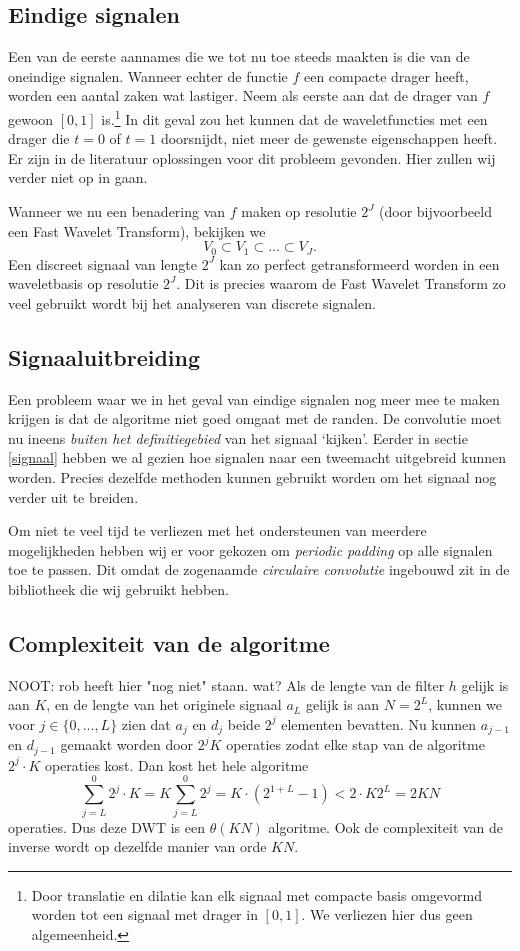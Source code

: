 \subsection{Eindige signalen}
Een van de eerste aannames die we tot nu toe steeds maakten is die van de oneindige signalen. Wanneer echter de functie $f$ een compacte drager heeft, worden een aantal zaken wat lastiger. Neem als eerste aan dat de drager van $f$ gewoon $[0,1]$ is.\footnote{Door translatie en dilatie kan elk signaal met compacte basis omgevormd worden tot een signaal met drager in $[0,1]$. We verliezen hier dus geen algemeenheid.} In dit geval zou het kunnen dat de waveletfuncties met een drager die $t=0$ of $t=1$ doorsnijdt, niet meer de gewenste eigenschappen heeft. Er zijn in de literatuur oplossingen voor dit probleem gevonden. Hier zullen wij verder niet op in gaan.

Wanneer we nu een benadering van $f$ maken op resolutie $2^J$ (door bijvoorbeeld een Fast Wavelet Transform), bekijken we
\[
V_0 \subset V_{1} \subset \ldots \subset V_{J}.
\]
Een discreet signaal van lengte $2^{J}$ kan zo perfect getransformeerd worden in een waveletbasis op resolutie $2^{J}$. Dit is precies waarom de Fast Wavelet Transform zo veel gebruikt wordt bij het analyseren van discrete signalen.

\subsection{Signaaluitbreiding}
Een probleem waar we in het geval van eindige signalen nog meer mee te maken krijgen is dat de algoritme niet goed omgaat met de randen. De convolutie moet nu ineens \emph{buiten het definitiegebied} van het signaal `kijken'. Eerder in sectie \ref{signaal} hebben we al gezien hoe signalen naar een tweemacht uitgebreid kunnen worden. Precies dezelfde methoden kunnen gebruikt worden om het signaal nog verder uit te breiden.

Om niet te veel tijd te verliezen met het ondersteunen van meerdere mogelijkheden hebben wij er voor gekozen om \emph{periodic padding} op alle signalen toe te passen. Dit omdat de zogenaamde \emph{circulaire convolutie} ingebouwd zit in de bibliotheek die wij gebruikt hebben.

\subsection{Complexiteit van de algoritme}
NOOT: rob heeft hier "nog niet" staan. wat?
Als de lengte van de filter $h$ gelijk is aan $K$, en de lengte van het originele signaal $a_L$ gelijk is aan $N = 2^{L}$, kunnen we voor $j \in \{0, \ldots, L\}$ zien dat $a_j$ en $d_j$ beide $2^{j}$ elementen bevatten. Nu kunnen $a_{j-1}$ en $d_{j-1}$ gemaakt worden door $2^{j}K$ operaties zodat elke stap van de algoritme $2^{j} \cdot K$ operaties kost. Dan kost het hele algoritme
\[
\sum_{j=L}^0 2^{j} \cdot K = K \sum_{j=L}^0 2^{j} = K \cdot (2^{1+L} - 1) < 2 \cdot K 2^{L} = 2KN
\]
operaties. Dus deze DWT is een $\theta(KN)$ algoritme. Ook de complexiteit van de inverse wordt op dezelfde manier van orde $KN$.

